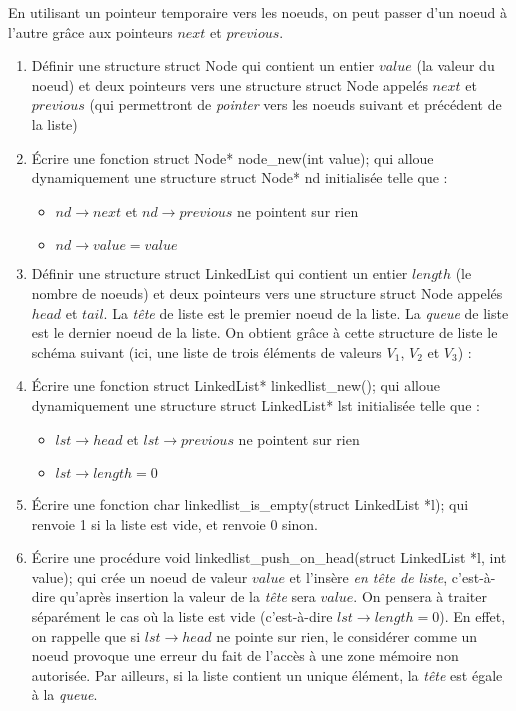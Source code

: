 \documentclass[../../../main.tex]{subfiles}
\begin{document}
En utilisant un pointeur temporaire vers les noeuds, on peut passer d'un noeud à l'autre grâce aux pointeurs $next$ et $previous$.
\begin{enumerate}
	\item Définir une structure \textsf{struct Node} qui contient un entier $value$ (la valeur du noeud) et deux pointeurs vers une structure \textsf{struct Node} appelés $next$ et $previous$ (qui permettront de \textit{pointer} vers les noeuds suivant et précédent de la liste)
	\item Écrire une fonction \textsf{struct Node* node\_new(int value);} qui alloue dynamiquement une structure \textsf{struct Node* nd} initialisée telle que :
	\begin{itemize}
		\item $nd\rightarrow next$ et $nd\rightarrow previous$ ne pointent sur rien
		\item $nd\rightarrow value = value$
	\end{itemize}
	\item Définir une structure \textsf{struct LinkedList} qui contient un entier $length$ (le nombre de noeuds) et deux pointeurs vers une structure \textsf{struct Node} appelés $head$ et $tail$. La \textit{tête} de liste est le premier noeud de la liste. La \textit{queue} de liste est le dernier noeud de la liste. On obtient grâce à cette structure de liste le schéma suivant (ici, une liste de trois éléments de valeurs $V_{1}$, $V_{2}$ et $V_{3}$) :

	\begin{minipage}{\textwidth}
	\begin{center}
	
	\end{center}
	\end{minipage}
	\item Écrire une fonction \textsf{struct LinkedList* linkedlist\_new();} qui alloue dynamiquement une structure \textsf{struct LinkedList* lst} initialisée telle que :
	\begin{itemize}
		\item $lst\rightarrow head$ et $lst\rightarrow previous$ ne pointent sur rien
		\item $lst\rightarrow length = 0$
	\end{itemize}
	\item Écrire une fonction \textsf{char linkedlist\_is\_empty(struct LinkedList *l);} qui renvoie \textsf{1} si la liste est vide, et renvoie \textsf{0} sinon.
	\item Écrire une procédure \textsf{void linkedlist\_push\_on\_head(struct LinkedList *l, int value);} qui crée un noeud de valeur $value$ et l'insère \textit{en tête de liste}, c'est-à-dire qu'après insertion la valeur de la \textit{tête} sera $value$. On pensera à traiter séparément le cas où la liste est vide (c'est-à-dire $lst\rightarrow length = 0$). En effet, on rappelle que si $lst\rightarrow head$ ne pointe sur rien, le considérer comme un noeud provoque une erreur du fait de l'accès à une zone mémoire non autorisée. Par ailleurs, si la liste contient un unique élément, la \textit{tête} est égale à la \textit{queue}.


\end{enumerate}
\end{document}
